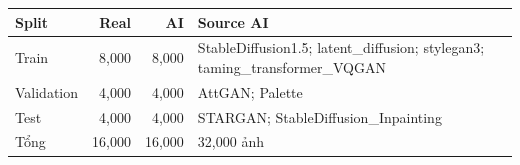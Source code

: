 \begin{tabularx}{\linewidth}{lrrX}
\toprule
Split & Real & AI & Source AI \\
\midrule
Train & 8,000 & 8,000 & StableDiffusion1.5; latent\_diffusion; stylegan3; taming\_transformer\_VQGAN \\
Validation & 4,000 & 4,000 & AttGAN; Palette \\
Test & 4,000 & 4,000 & STARGAN; StableDiffusion\_Inpainting \\
\midrule
Tổng & 16,000 & 16,000 & 32,000 ảnh \\
\bottomrule
\end{tabularx}
